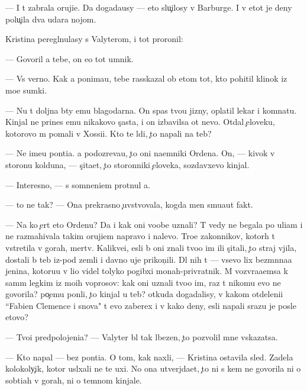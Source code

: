 \documentclass[10pt]{book}
\begin{document}
— I t{\yi} zabrala oruji{\y}e. Da{\y} dogada{\y}usy — eto slu{\c}ilosy v Barburge. I v etot je deny polu{\c}ila dva udara nojom.

Kristina peregl{\ia}nulasy s Valyterom, i tot proronil:

— Govoril {\y}a tebe, on {\y}e{\x}o tot umnik.

— Vs{\e} verno. Kak {\y}a ponima{\y}u, tebe rasskazal ob etom tot, kto pohitil klinok iz mo{\y}e{\y} sumki.

— Nu t{\yi} doljna b{\yi}ty {\y}emu blagodarna. On spas tvo{\y}u jizny, oplatil lekar{\ia} i komnatu. Kinjal ne prines {\y}emu nikakovo s{\c}ast{\y}a, i on izbavilsa ot nevo. Otdal {\c}eloveku, kotorovo m{\yi} po{\y}mali v Xossi{\y}i. Kto te l{\iu}di, {\c}to napali na teb{\ia}?

— Ne ime{\y}u pon{\ia}ti{\y}a. {\Y}a podozreva{\y}u, {\c}to oni na{\y}emniki Ordena. On, — kivok v storonu kolduna, — s{\c}ita{\y}et, {\c}to storonniki {\c}eloveka, sozdavxevo kinjal.

— Interesno, — s somneni{\y}em prot{\ia}nul {\y}a.

— {\C}to ne tak? — Ona prekrasno {\c}uvstvovala, kogda men{\ia} smu{\x}a{\y}ut fakt{\yi}.

— Na ko{\y} {\c}ert eto Ordenu? Da i kak oni voob{\x}e uznali? T{\yi} vedy ne begala po uli{\q}am i ne razmahivala takim oruji{\y}em napravo i nalevo. Tro{\y}e zakonnikov, kotor{\yi}h t{\yi} vstretila v gorah, mertv{\yi}. Kalikve{\q}i, {\y}esli b{\yi} oni znali tvo{\y}o im{\ia} ili s{\c}itali, {\c}to straj v{\yi}jila, dostali b{\yi} teb{\ia} iz-pod zemli i davno uje prikon{\c}ili. Dl{\ia} nih t{\yi} — vsevo lix bez{\yi}m{\ia}nna{\y}a jen{\x}ina, kotoru{\y}u v li{\q}o videl tolyko pogibxi{\y} monah-privratnik. M{\yi} vozvra{\x}a{\y}emsa k sam{\yi}m legkim iz mo{\y}ih voprosov: kak oni uznali tvo{\y}o im{\ia}, raz t{\yi} nikomu {\y}evo ne govorila? po{\c}emu pon{\ia}li, {\c}to kinjal u teb{\ia}? otkuda dogadalisy, v kakom otdeleni{\y}i ``Fabien Clemence i s{\yi}nov{\y}a" t{\yi} {\y}evo zaberex i v kako{\y} deny, {\y}esli napali srazu je posle etovo?

— Tvo{\y}i predpolojeni{\y}a? — Valyter b{\yi}l tak l{\iu}bezen, {\c}to pozvolil mne v{\yi}skazatsa.

— Kto napal — bez pon{\ia}ti{\y}a. O tom, kak naxli, — Kristina ostavila sled{\yi}. Zadela kolokoly{\c}ik, kotor{\yi}{\y} usl{\yi}xali ne te uxi. No ona utverjda{\y}et, {\c}to ni s kem ne govorila ni o sob{\yi}ti{\y}ah v gorah, ni o temnom kinjale.
\end{document}
